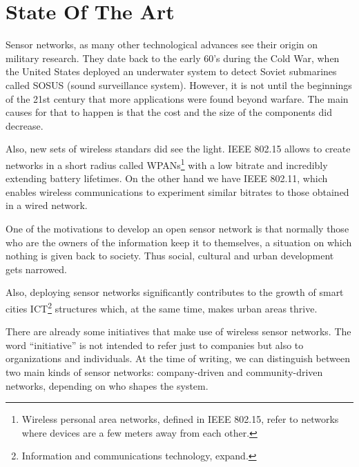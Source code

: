 \chapter{State Of The Art} %

\label{Chapter2} %



Sensor networks, as many other technological advances see their origin on military research. They date back to the early 60's during the Cold War, when the United States deployed an underwater system to detect Soviet submarines called SOSUS (sound surveillance system). However, it is not until the beginnings of the 21st century that more applications were found beyond warfare. The main causes for that to happen is that the cost and the size of the components did decrease.

Also, new sets of wireless standars did see the light. IEEE 802.15 allows to create networks in a short radius called WPANs\footnote{Wireless personal area networks, defined in IEEE 802.15, refer to networks where devices are a few meters away from each other.} with a low bitrate and incredibly extending battery lifetimes. On the other hand we have IEEE 802.11, which enables wireless communications to experiment similar bitrates to those obtained in a wired network.

One of the motivations to develop an open sensor network is that normally those who are the owners of the information keep it to themselves, a situation on which nothing is given back to society. Thus social, cultural and urban development  gets narrowed\citep{hollands2008will}.

Also, deploying sensor networks significantly contributes to the growth of smart cities ICT\footnote{Information and communications technology, expand.} structures which, at the same time, makes urban areas thrive\citep{caragliu2009smart}.

There are already some initiatives that make use of wireless sensor networks. The word ``initiative'' is not intended to refer just to companies but also to organizations and individuals. At the time of writing, we can distinguish between two main kinds of sensor networks: company-driven and community-driven networks, depending on who shapes the system.

